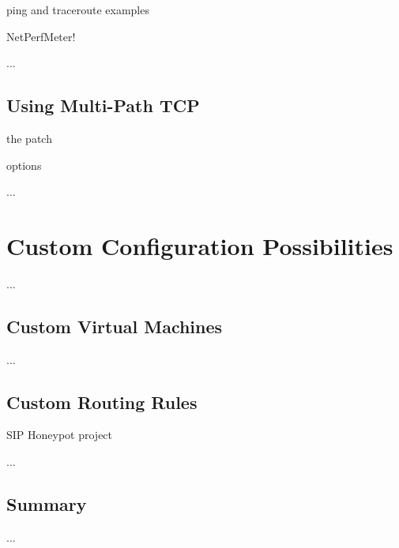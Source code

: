 ping and traceroute examples

NetPerfMeter!

...


\section{Using Multi-Path TCP}
\label{sec:Using-Multi-Path-TCP}

the patch

options

...



\chapter{Custom Configuration Possibilities}
\label{cha:Custom-Configuration-Possibilities}

...


\section{Custom Virtual Machines}
\label{sec:Custom-Virtual-Machines}

...


\section{Custom Routing Rules}
\label{sec:Custom-Routing-Rules}

SIP Honeypot project~\cite{IFIPNetworking2014}

...



\section{Summary}

...
